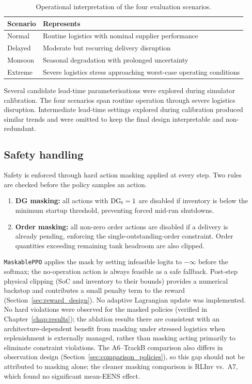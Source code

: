 \begin{table}[htb]
\centering
\small
\caption{Operational interpretation of the four evaluation scenarios.}
\label{tab:scenario_meaning}
\begin{tabular}{lp{7.5cm}}
\toprule
\textbf{Scenario} & \textbf{Represents} \\
\midrule
Normal   & Routine logistics with nominal supplier performance \\
Delayed  & Moderate but recurring delivery disruption \\
Monsoon  & Seasonal degradation with prolonged uncertainty \\
Extreme  & Severe logistics stress approaching worst-case operating
           conditions \\
\bottomrule
\end{tabular}
\end{table}

Several candidate lead-time parameterisations were explored during
simulator calibration. The four scenarios span routine operation through
severe logistics disruption. Intermediate lead-time settings explored
during calibration produced similar trends and were omitted to keep the
final design interpretable and non-redundant.

\subsection{Safety handling}

Safety is enforced through hard action masking applied at every step. Two
rules are checked before the policy samples an action.

\begin{enumerate}
  \item \textbf{DG masking:} all actions with $\mathrm{DG}_t = 1$ are disabled if
  inventory is below the minimum startup threshold, preventing forced
  mid-run shutdowns.
  \item \textbf{Order masking:} all non-zero order actions are disabled if
  a delivery is already pending, enforcing the single-outstanding-order
  constraint. Order quantities exceeding remaining tank headroom are also
  clipped.
\end{enumerate}

\texttt{MaskablePPO} applies the mask by setting infeasible logits to
$-\infty$ before the softmax; the no-operation action is always feasible
as a safe fallback. Post-step physical clipping (SoC and inventory to
their bounds) provides a numerical backstop and contributes a small
penalty term to the reward (Section~\ref{sec:reward_design}). No adaptive
Lagrangian update was implemented. No hard violations were observed for
the masked policies (verified in Chapter~\ref{chap:results}); the
ablation results there are consistent with an architecture-dependent
benefit from masking under stressed logistics when replenishment is
externally managed, rather than masking acting primarily to eliminate
constraint violations. The A6--TrackB comparison also differs in
observation design (Section~\ref{sec:comparison_policies}), so this gap should not
be attributed to masking alone; the cleaner masking comparison is
RLInv vs.\ A7, which found no significant mean-EENS effect.

